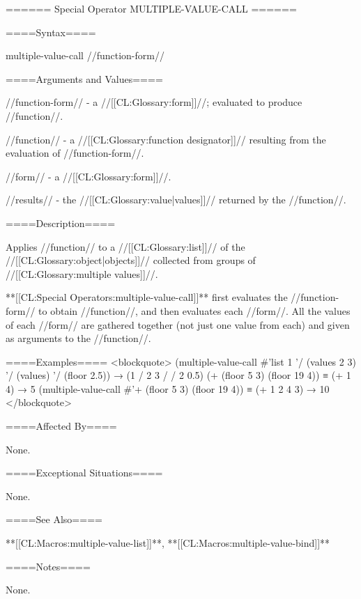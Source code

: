 ====== Special Operator MULTIPLE-VALUE-CALL ======

====Syntax====

\DefspecWithValues multiple-value-call {//function-form// } {}

====Arguments and Values====

//function-form// - a //[[CL:Glossary:form]]//; evaluated to produce //function//.

//function// - a //[[CL:Glossary:function designator]]// resulting from the evaluation of //function-form//.

//form// - a //[[CL:Glossary:form]]//.

//results// - the //[[CL:Glossary:value|values]]// returned by the //function//.

====Description====

Applies //function// to a //[[CL:Glossary:list]]// of the //[[CL:Glossary:object|objects]]// collected from groups of //[[CL:Glossary:multiple values]]//.

**[[CL:Special Operators:multiple-value-call]]** first evaluates the //function-form// to obtain //function//, and then evaluates each //form//. All the values of each //form// are gathered together (not just one value from each) and given as arguments to the //function//.

====Examples==== <blockquote> (multiple-value-call #'list 1 '/ (values 2 3) '/ (values) '/ (floor 2.5)) → (1 / 2 3 / / 2 0.5) (+ (floor 5 3) (floor 19 4)) ≡ (+ 1 4) → 5 (multiple-value-call #'+ (floor 5 3) (floor 19 4)) ≡ (+ 1 2 4 3) → 10 </blockquote>

====Affected By====

None.

====Exceptional Situations====

None.

====See Also====

**[[CL:Macros:multiple-value-list]]**, **[[CL:Macros:multiple-value-bind]]**

====Notes====

None.

